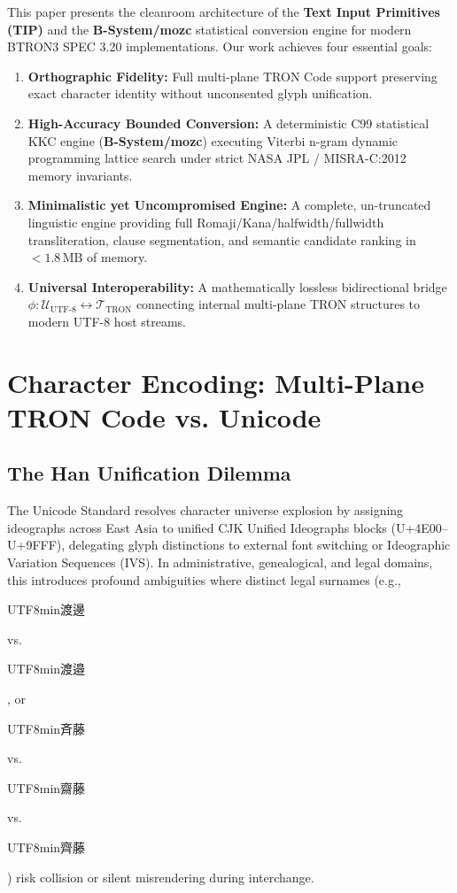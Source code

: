 \documentclass[10pt,journal,compsoc,twocolumn]{article}
\newcommand{\ja}[1]{\begin{CJK*}{UTF8}{min}#1\end{CJK*}}
\begin{document}
This paper presents the cleanroom architecture of the \textbf{Text Input Primitives (TIP)} and the \textbf{B-System/mozc} statistical conversion engine for modern BTRON3 SPEC 3.20 implementations. Our work achieves four essential goals:
\begin{enumerate}[leftmargin=*]
    \item \textbf{Orthographic Fidelity:} Full multi-plane TRON Code support preserving exact character identity without unconsented glyph unification.
    \item \textbf{High-Accuracy Bounded Conversion:} A deterministic C99 statistical KKC engine (\textbf{B-System/mozc}) executing Viterbi n-gram dynamic programming lattice search under strict NASA JPL / MISRA-C:2012 memory invariants.
    \item \textbf{Minimalistic yet Uncompromised Engine:} A complete, un-truncated linguistic engine providing full Romaji/Kana/halfwidth/fullwidth transliteration, clause segmentation, and semantic candidate ranking in $< 1.8\,\text{MB}$ of memory.
    \item \textbf{Universal Interoperability:} A mathematically lossless bidirectional bridge $\phi: \mathcal{U}_{\text{UTF-8}} \leftrightarrow \mathcal{T}_{\text{TRON}}$ connecting internal multi-plane TRON structures to modern UTF-8 host streams.
\end{enumerate}

\section{Character Encoding: Multi-Plane TRON Code vs. Unicode}
\label{sec:encoding}

\subsection{The Han Unification Dilemma}
The Unicode Standard resolves character universe explosion by assigning ideographs across East Asia to unified CJK Unified Ideographs blocks (U+4E00--U+9FFF), delegating glyph distinctions to external font switching or Ideographic Variation Sequences (IVS). In administrative, genealogical, and legal domains, this introduces profound ambiguities where distinct legal surnames (e.g., \ja{渡邊} vs. \ja{渡邉}, or \ja{斉藤} vs. \ja{齋藤} vs. \ja{齊藤}) risk collision or silent misrendering during interchange.
\end{document}
